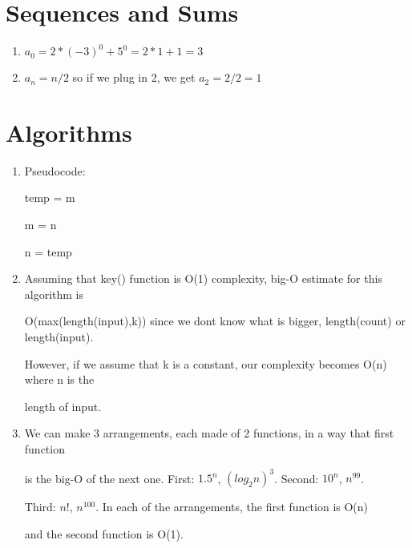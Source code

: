 \documentclass[11pt]{article}
\begin{document}
\section{Sequences and Sums}

\begin{enumerate}[label=(\alph*)]

\item
$a_0=2*(-3)^0+5^0=2*1+1=3$ 

\item
$a_n=n/2$ so if we plug in 2, we get $a_2=2/2=1$
\end{enumerate}



\section{Algorithms}

\begin{enumerate}[label=(\alph*)]

\item
Pseudocode: 

temp = m

m = n

n = temp

\item
Assuming that key() function is O(1) complexity, big-O estimate for this algorithm is 

O(max(length(input),k)) since we dont know what is bigger, length(count) or length(input). 

However, if we assume that k is a constant, our complexity becomes O(n) where n is the

length of input. 

\item
We can make 3 arrangements, each made of 2 functions, in a way that first function

is the big-O of the next one. First: $1.5^n$, $(log_2n)^3$. Second: $10^n$, $n^{99}$.

Third: $n!$, $n^{100}$. In each of the arrangements, the first function is O(n)

and the second function is O(1).



\end{enumerate}
\end{document}
